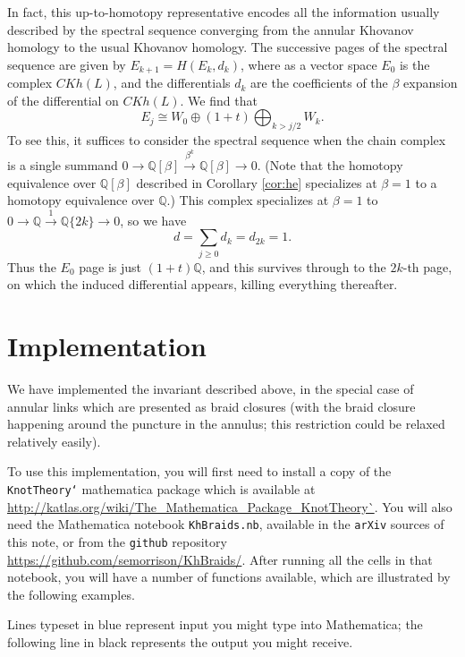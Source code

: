 \documentclass{amsart}
\theoremstyle{plain}
\newcommand{\complexk}[1]{0\rightarrow\mathbb Q [\beta]\xrightarrow{\beta^{#1}}{}\mathbb Q [\beta]\rightarrow 0}
\begin{document}
In fact, this up-to-homotopy representative encodes all the information usually described by the spectral sequence converging from the annular Khovanov homology to the usual Khovanov homology. The successive pages of the spectral sequence are given by 
$E_{k+1} = H(E_k, d_k)$, where as a vector space $E_0$ is the complex $CKh(L)$, and the differentials $d_k$ are the coefficients of the $\beta$ expansion of the differential on $CKh(L)$. We find that
$$E_j \cong W_0 \oplus (1+t) \bigoplus_{k > j/2} W_k.$$
To see this, 
 it suffices to consider the spectral sequence when the chain complex is a single summand $\complexk{k}$. (Note that the homotopy equivalence over $\mathbb Q[\beta]$ described in Corollary \ref{cor:he} specializes at $\beta = 1$ to a homotopy equivalence over $\mathbb Q$.) This complex specializes at $\beta = 1$ to $0 \rightarrow \mathbb Q \xrightarrow{1} \mathbb Q\{2k\} \rightarrow 0$, so we have $$d = \sum_{j \geq 0} d_k = d_{2k} = 1.$$ Thus the $E_0$ page is just $(1+t)\mathbb Q$, and this survives through to the $2k$-th page, on which the induced differential appears, killing everything thereafter.



\section{Implementation}
We have implemented the invariant described above, in the special case of annular links which are presented as braid closures (with the braid closure happening around the puncture in the annulus; this restriction could be relaxed relatively easily).

To use this implementation, you will first need to install a copy of the {\tt KnotTheory`} mathematica package which is available at \url{http://katlas.org/wiki/The_Mathematica_Package_KnotTheory`}. You will also need the Mathematica notebook {\tt KhBraids.nb}, available 
in the {\tt arXiv} sources of this note, or from
the {\tt github} repository \url{https://github.com/semorrison/KhBraids/}. After running all the cells in that notebook, you will have a number of functions available, which are illustrated by the following examples.

Lines typeset in blue represent input you might type into Mathematica; the following line in black represents the output you might receive.
\end{document}
